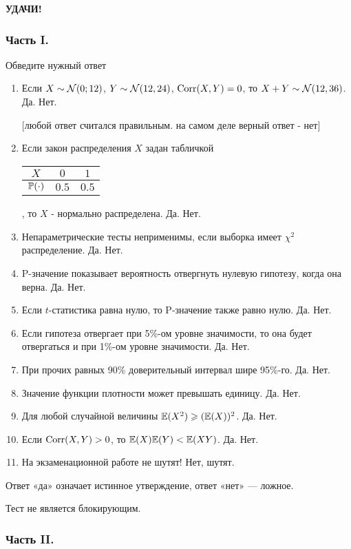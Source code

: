 \textbf{УДАЧИ!}

\subsubsection*{Часть I.}

Обведите нужный ответ

\begin{enumerate}
\item Если $X\sim \cN(0;12)$, $Y\sim \cN(12,24)$, $\Corr(X,Y)=0$, то
$X+Y\sim \cN(12,36)$.
Да. Нет.

$[$любой ответ считался правильным. на самом деле верный ответ -
нет$]$

\item Если закон распределения $X$ задан табличкой

\begin{tabular}{@{}ccc@{}}
\toprule
$X$      & $0$   & $1$   \\ \midrule
$\P(\cdot)$ & $0.5$ & $0.5$ \\ \bottomrule
\end{tabular}, то $X$ - нормально распределена. Да. Нет.

\item Непараметрические тесты неприменимы, если выборка имеет
$\chi^{2}$ распределение. Да. Нет.
\item P-значение показывает вероятность отвергнуть нулевую
гипотезу, когда она верна. Да. Нет.
\item Если $t$-статистика равна нулю, то P-значение также равно
нулю. Да. Нет.
\item Если гипотеза отвергает при 5\%-ом уровне значимости, то
она будет отвергаться и при 1\%-ом уровне значимости. Да. Нет.
\item При прочих равных 90\% доверительный интервал шире 95\%-го. Да. Нет.
\item Значение функции плотности может превышать единицу. Да. Нет.
\item Для любой случайной величины  $\E(X^{2} )\ge
(\E(X))^{2}$. Да. Нет.
\item Если $\Corr(X,Y)>0$, то $\E(X)\E(Y)<\E(XY)$. Да. Нет.
\item На экзаменационной работе не шутят! Нет, шутят.
\end{enumerate}

Ответ «да» означает истинное утверждение, ответ «нет» — ложное.

Тест не является блокирующим.


\subsubsection*{Часть II.}

